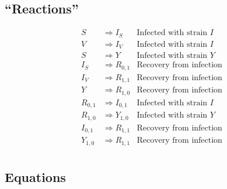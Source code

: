 \documentclass[10pt,a4paper]{article}
\begin{document}
\subsection{``Reactions''}
\begin{align}
    S & \Rightarrow I_S & \text{Infected with strain }I \\ 
    V & \Rightarrow I_V & \text{Infected with strain }I \\ 
    S & \Rightarrow Y & \text{Infected with strain }Y \\ 
    I_S & \Rightarrow R_{0,1} & \text{Recovery from infection} \\ 
    I_V & \Rightarrow R_{1,1} & \text{Recovery from infection} \\ 
    Y & \Rightarrow R_{1,0} & \text{Recovery from infection} \\ 
    R_{0,1} & \Rightarrow I_{0,1} & \text{Infected with strain }I \\ 
    R_{1,0} & \Rightarrow Y_{1,0} & \text{Infected with strain }Y \\ 
    I_{0,1} & \Rightarrow R_{1,1} & \text{Recovery from infection} \\ 
    Y_{1,0} & \Rightarrow R_{1,1} & \text{Recovery from infection} \\ 
\end{align}

\subsection{Equations}


\end{document}
